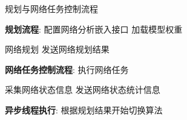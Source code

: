 

\begin{algorithm}
\caption{规划与网络任务控制流程}
\label{algo_proc}
\begin{algorithmic}[1]

\STATE \textbf{规划流程}:
\STATE 配置网络分析嵌入接口
\STATE 加载模型权重

    \STATE 网络规划
    \STATE 发送网络规划结果
\ENDWHILE

\STATE \textbf{网络任务控制流程}:
\STATE 执行网络任务

    \STATE 采集网络状态信息
    \STATE 发送网络状态统计信息
\ENDWHILE

\STATE \textbf{异步线程执行}:
    \STATE 根据规划结果开始切换算法
\ENDWHILE

\end{algorithmic}
\end{algorithm}
